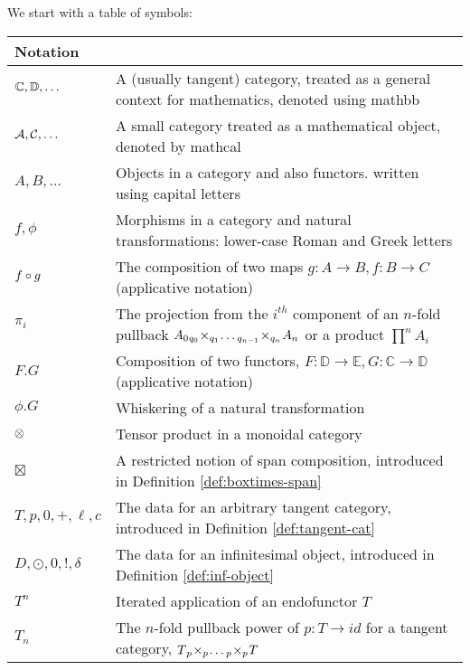 We start with a table of symbols:
\begin{center}
    \begin{tabular}{|p{2cm}|p{13cm}|}
    \hline
    \textbf{Notation}  &
       \\\hline
    $\mathbb{C}, \mathbb{D}, \dots$  &
      A (usually tangent) category, treated as a general context for mathematics, denoted using mathbb \\ \hline
    $\mathcal{A}, \mathcal{C}, \dots$  &
     A small category treated as a mathematical object, denoted by mathcal \\ \hline
    $A, B, \dots$ &
     Objects in a category and also functors. written using capital letters \\ \hline
    $f, \phi$ &
     Morphisms in a category and natural transformations: lower-case Roman and Greek letters \\ \hline
    $f \circ g$ &
     The composition of two maps $g:A \to B, f:B \to C$ (applicative notation) \\ \hline
    $\pi_i$ &
     The projection from the $i^{th}$ component of an $n$-fold pullback $A_0 {_{q_0}}\!\times_{q_1}\! \dots {_{q_{n-1}}}\!\times_{q_n}\!A_n$ or a product $\prod^n A_i$ \\ \hline
    $F.G$ &
     Composition of two functors, $F:\mathbb{D} \to \mathbb{E}, G: \mathbb{C} \to \mathbb{D}$ (applicative notation) \\ \hline
    $\phi.G$ &
     Whiskering of a natural transformation \\ \hline
    $\otimes$ &
     Tensor product in a monoidal category \\ \hline
    $\boxtimes$ &
     A restricted notion of span composition, introduced in Definition \ref{def:boxtimes-span} \\ \hline
     $T, p, 0, +, \ell, c$ &
    The data for an arbitrary tangent category, introduced in Definition \ref{def:tangent-cat} \\ \hline
    $D, \odot, 0, !, \delta$ &
     The data for an infinitesimal object, introduced in Definition \ref{def:inf-object} \\ \hline
    $T^n$ &
     Iterated application of an endofunctor $T$ \\ \hline
    $T_n$ &
     The $n$-fold pullback power of $p:T \to id$ for a tangent category, $T {_{p}}\!\times_{p}\! \dots {_{p}}\!\times_{p}\! T$ \\ \hline
    \end{tabular}
\end{center}


